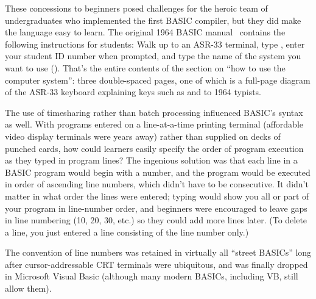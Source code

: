 These concessions to beginners posed challenges for the heroic team of
undergraduates who implemented the first BASIC compiler,
but they did make the language easy to learn.
The original 1964 BASIC manual~\cite[p. 14]{dartmouth_basic_manual}
contains the following instructions for students:
Walk up to an ASR-33 terminal, type , enter your student ID
number when prompted, and type the name of the system you want to use
().
That's the entire contents of the section on ``how to use the computer
system'': three double-spaced pages, one of which is a full-page diagram of the ASR-33
keyboard explaining keys such as  and  to 1964
typists.


The use of timesharing rather than batch processing influenced
BASIC's syntax as well.
With programs entered on a line-at-a-time printing terminal
(affordable video display
terminals were years away) rather than supplied on decks of punched
cards, how could learners easily specify the order of program execution
as they typed in program lines?
The ingenious solution was that each line in a BASIC
program would begin with a number, and the program would be
executed in order of ascending line numbers, which didn't have to be
consecutive.  
It didn't matter in what order the lines were entered;
typing  would show
you all or part of your program in line-number order,
and beginners were encouraged to leave gaps in line
numbering (10, 20, 30, etc.) so they could add
more lines later.  (To delete a line, you just entered a line
consisting of the line number only.)

  \begin{tangent}
  The convention of line numbers was retained in virtually all ``street
  BASICs'' long after cursor-addressable CRT terminals were ubiquitous,
  and was finally dropped in Microsoft Visual Basic (although many modern
  BASICs, including VB, still allow them).
  \end{tangent}

